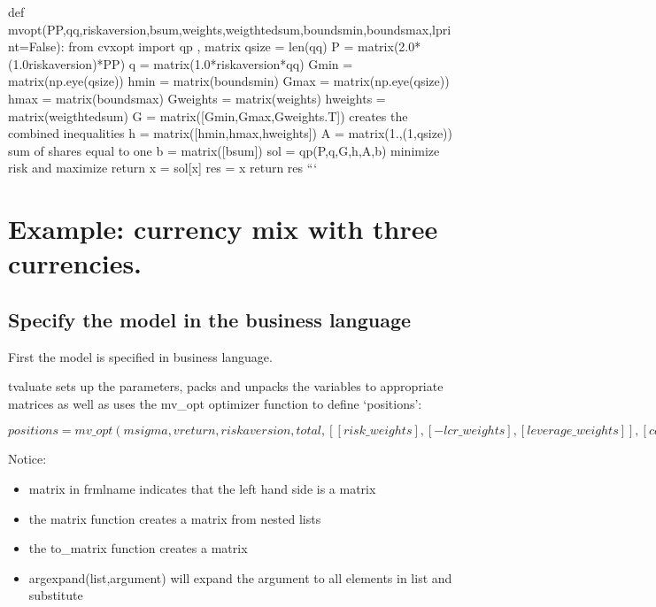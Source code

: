 \documentclass[letterpaper,10pt,english]{jupyterBook}
\begin{document}
\begin{sphinxVerbatim}[commandchars=\\\{\}]
def mv\PYGZus{}opt(PP,qq,riskaversion,bsum,weights,weigthtedsum,boundsmin,boundsmax,lprint=False):
    from cvxopt import qp , matrix
    q\PYGZus{}size   =  len(qq)
    P        =  matrix(2.0*(1.0\PYGZhy{}riskaversion)*PP)                
    q        =  matrix(\PYGZhy{}1.0*riskaversion*qq)
    Gmin     = \PYGZhy{}matrix(np.eye(q\PYGZus{}size))
    hmin     = \PYGZhy{}matrix(boundsmin)
    Gmax     =  matrix(np.eye(q\PYGZus{}size))
    hmax     =  matrix(boundsmax)
    Gweights =  matrix(weights)
    hweights =  matrix(weigthtedsum)
    G        =  matrix([Gmin,Gmax,Gweights.T])\PYGZsh{} creates the combined inequalities 
    h        =  matrix([hmin,hmax,hweights])
    A        =  matrix(1.,(1,q\PYGZus{}size))        \PYGZsh{} sum of shares equal to one
    b        =  matrix([bsum])   
    sol      = qp(P,q,G,h,A,b)               \PYGZsh{} minimize risk and maximize return 
    x        = sol[\PYGZsq{}x\PYGZsq{}] 
    res      = x
    return res
    ```
\end{sphinxVerbatim}


\section{Example: currency mix with three currencies.}
\label{\detokenize{content/howto/optimization/Optimize_simpel:example-currency-mix-with-three-currencies}}

\subsection{Specify the model in the business language}
\label{\detokenize{content/howto/optimization/Optimize_simpel:specify-the-model-in-the-business-language}}
\sphinxAtStartPar
First the model is specified in business language.

\sphinxAtStartPar
tvaluate sets up the parameters, packs and unpacks the variables to appropriate matrices as well as uses the mv\_opt optimizer function to define ‘positions’:

\sphinxAtStartPar
\(positions          =  mv\_opt(msigma,vreturn,riskaversion, total, 
                                       [[risk\_weights] , [-lcr\_weights] , [leverage\_weights]],
                                           [capital, -lcr , equity] ,min_w,max_w) \)

\sphinxAtStartPar
Notice:
\begin{itemize}
\item {} 
\sphinxAtStartPar
matrix in frmlname indicates that the left hand side is a matrix

\item {} 
\sphinxAtStartPar
the matrix function creates a matrix from nested lists

\item {} 
\sphinxAtStartPar
the to\_matrix function creates a matrix

\item {} 
\sphinxAtStartPar
argexpand(list,argument) will expand the argument to all elements in list and substitute

\end{itemize}
\end{document}

